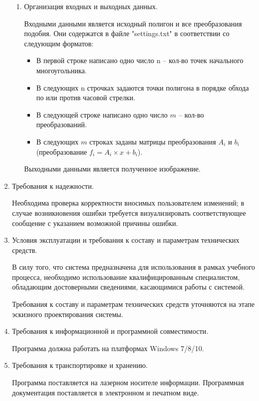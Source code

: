 \documentclass[a4paper,12pt,preview]{report} %
\renewcommand{\theenumi}{\arabic{enumi}}%
\renewcommand{\labelenumi}{\arabic{enumi}}%
\newenvironment{boenumerate}
{\begin{enumerate}\renewcommand\labelenumi{\textbf\theenumi}}
	{\end{enumerate}}
\begin{document}
\begin{boenumerate}
\begin{enumerate}
\begin{enumerate}
				\item Организация входных и выходных данных.
				
				Входными данными является исходный полигон и все преобразования подобия. Они содержатся в файле "settings.txt" в соответствии со следующим форматов:
				
				\begin{itemize}
					\item В первой строке написано одно число n – кол-во точек начального многоугольника.
					\item В следующих n строчках задаются точки полигона в порядке обхода по или против часовой стрелки.
					\item В следующей строке написано одно число $m$ – кол-во преобразований.
					\item В следующих $m$ строках заданы матрицы преобразования $A_i$ и $b_i$ (преобразование $f_i = A_i \times x + b_i$). 
				\end{itemize} 
			
				
				Выходными данными является полученное изображение.
				
			
			\end{enumerate}
		
		\item Требования к надежности.
		
		Необходима проверка корректности вносимых пользователем изменений; в случае возникновения ошибки требуется визуализировать соответствующее сообщение с указанием возможной причины ошибки.
		
		\item Условия эксплуатации и требования к составу и параметрам технических средств.
			
		В силу того, что система предназначена для использования в рамках учебного процесса, необходимо использование квалифицированным специалистом, обладающим достоверными сведениями, касающимися работы с системой.
		
		Требования к составу и параметрам технических средств уточняются на этапе эскизного проектирования системы.
		
		\item Требования к информационной и программной совместимости.
		
		Программа должна работать на платформах Windows 7/8/10.
		
		\item Требования к транспортировке и хранению.
		
		Программа поставляется на лазерном носителе информации. Программная документация поставляется в электронном и печатном виде.
		

\end{enumerate}
\end{boenumerate}
\end{document}
